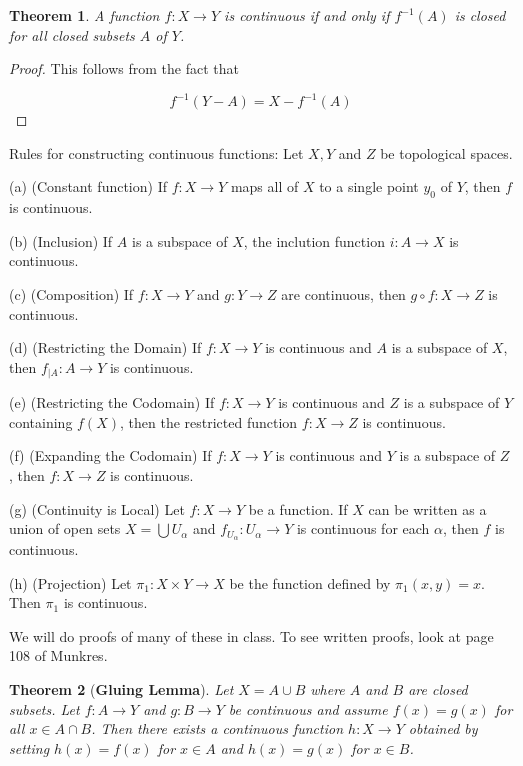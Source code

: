 \documentclass[a4paper]{article}
\newcommand{\jump}{\vspace{0.3cm}}
\newtheorem{theorem}{Theorem}
\numberwithin{theorem}{section}
\begin{document}
\jump

\begin{theorem}
A function $f: X \rightarrow Y$ is continuous if and only if $f^{-1}(A)$ is closed for all closed subsets $A$ of $Y$.
\end{theorem}

\begin{proof}
This follows from the fact that 

$$ f^{-1}(Y-A) = X - f^{-1}(A) $$
\end{proof}

\jump

Rules for constructing continuous functions: Let $X,Y$ and $Z$ be topological spaces.  

\jump

(a) (Constant function) If $f: X \rightarrow Y$ maps all of $X$ to a single point $y_0$ of $Y$, then $f$ is continuous. 

(b) (Inclusion) If $A$ is a subspace of $X$, the inclution function $i: A \rightarrow X$ is continuous.

(c) (Composition) If $f: X \rightarrow Y$ and $g: Y \rightarrow Z$ are continuous, then $g \circ f: X \rightarrow Z$ is continuous.

(d) (Restricting the Domain) If $f: X \rightarrow Y$ is continuous and $A$ is a subspace of $X$, then $f_{|A}: A \rightarrow Y$ is continuous.

(e) (Restricting the Codomain) If $f: X \rightarrow Y$ is continuous and $Z$ is a subspace of $Y$ containing $f(X)$, then the restricted function $f: X \rightarrow Z$ is continuous.

(f) (Expanding the Codomain) If $f: X \rightarrow Y$ is continuous and $Y$ is a subspace of $Z$, then $f: X \rightarrow Z$ is continuous.

(g) (Continuity is Local) Let $f: X \rightarrow Y$ be a function. If $X$ can be written as a union of open sets $X = \bigcup U_\alpha$ and $f_{U_\alpha}: U_\alpha \rightarrow Y$ is continuous for each $\alpha$, then $f$ is continuous.

(h) (Projection) Let $\pi_1: X \times Y \rightarrow X$ be the function defined by $\pi_1(x,y) = x$. Then $\pi_1$ is continuous.

We will do proofs of many of these in class. To see written proofs, look at page 108 of Munkres.

\jump

\begin{theorem}[\textbf{Gluing Lemma}]
Let $X = A \cup B$ where $A$ and $B$ are closed subsets. Let $f:A \rightarrow Y$ and $g: B \rightarrow Y$ be continuous and assume $f(x) = g(x)$ for all $x \in A \cap B$. Then there exists a continuous function $h: X \rightarrow Y$ obtained by setting $h(x) = f(x)$ for $x \in A$ and $h(x) = g(x)$ for $x \in B$.
\end{theorem}
\end{document}
